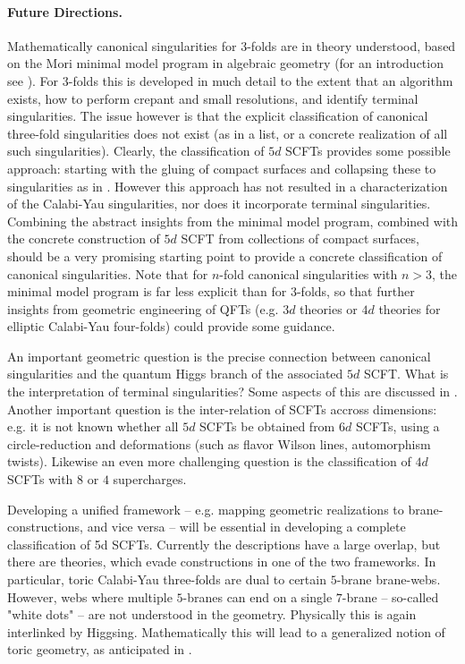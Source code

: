 \documentclass[12pt]{article}
\begin{document}
\paragraph{Future Directions.}

Mathematically canonical singularities for $3$-folds are in theory understood, based on the Mori minimal model program in algebraic geometry (for an introduction see \cite{Matsuki}). For $3$-folds this is developed in much detail to the extent that an algorithm exists, how to perform crepant and small  resolutions, and identify terminal singularities. The issue however is that the explicit classification of canonical three-fold singularities does not exist (as in a list, or a concrete realization of all such singularities). Clearly, the classification of $5d$ SCFTs provides some possible approach: starting with the gluing of compact surfaces and collapsing these to singularities as in \cite{Jefferson:2018irk}. However this approach has not resulted in a characterization of the Calabi-Yau singularities, nor does it incorporate terminal singularities. Combining the abstract insights from the minimal model program, combined with the  concrete construction of $5d$ SCFT from collections of compact surfaces, should be a very promising starting point to provide a concrete classification of canonical singularities. Note that for $n$-fold canonical singularities with $n>3$, the minimal model program is far less explicit than for $3$-folds, so that further insights from geometric engineering of QFTs (e.g. $3d$ theories or $4d$ theories for elliptic Calabi-Yau four-folds) could provide some guidance. 



An important geometric question is the precise connection between canonical singularities and the quantum Higgs branch of the associated $5d$ SCFT.  What is the interpretation of terminal singularities? Some aspects of this are discussed in \cite{Closset:2020scj, Collinucci:2021ofd}.
Another important question is the inter-relation of SCFTs accross  dimensions: e.g. it is not known whether all $5d$ SCFTs be obtained from $6d$ SCFTs, using a circle-reduction and deformations (such as flavor Wilson lines, automorphism twists). Likewise an even more challenging question is the classification of $4d$ SCFTs with $8$ or $4$ supercharges. 

Developing a unified framework -- e.g.  mapping geometric realizations to brane-constructions, and vice versa -- will be essential in developing a complete classification of 5d SCFTs. Currently the descriptions have a large overlap, but there are theories, which evade constructions in one of the two frameworks. 
In particular, toric Calabi-Yau three-folds are dual to certain $5$-brane brane-webs. However, webs where multiple $5$-branes can end on a single $7$-brane -- so-called "white dots"  \cite{Benini:2009gi} --  are not understood in the geometry. Physically this is again interlinked by Higgsing. Mathematically this will lead to a generalized notion of toric geometry, as anticipated in \cite{Cabrera:2018jxt, VanBeest:2020kxw}. 
\end{document}
